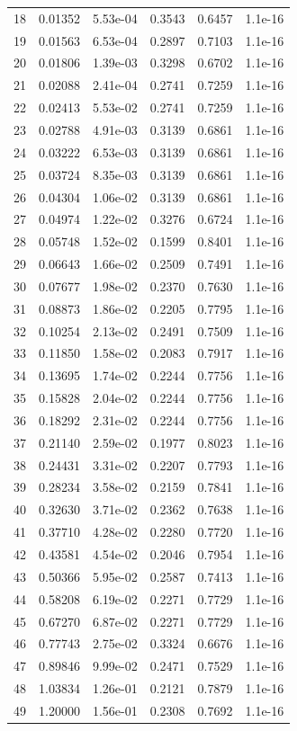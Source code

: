 {\begin{longtable}{rrrrrr}
18 & 0.01352 & 5.53e-04 & 0.3543 & 0.6457 & 1.1e-16 \\
19 & 0.01563 & 6.53e-04 & 0.2897 & 0.7103 & 1.1e-16 \\
20 & 0.01806 & 1.39e-03 & 0.3298 & 0.6702 & 1.1e-16 \\
21 & 0.02088 & 2.41e-04 & 0.2741 & 0.7259 & 1.1e-16 \\
22 & 0.02413 & 5.53e-02 & 0.2741 & 0.7259 & 1.1e-16 \\
23 & 0.02788 & 4.91e-03 & 0.3139 & 0.6861 & 1.1e-16 \\
24 & 0.03222 & 6.53e-03 & 0.3139 & 0.6861 & 1.1e-16 \\
25 & 0.03724 & 8.35e-03 & 0.3139 & 0.6861 & 1.1e-16 \\
26 & 0.04304 & 1.06e-02 & 0.3139 & 0.6861 & 1.1e-16 \\
27 & 0.04974 & 1.22e-02 & 0.3276 & 0.6724 & 1.1e-16 \\
28 & 0.05748 & 1.52e-02 & 0.1599 & 0.8401 & 1.1e-16 \\
29 & 0.06643 & 1.66e-02 & 0.2509 & 0.7491 & 1.1e-16 \\
30 & 0.07677 & 1.98e-02 & 0.2370 & 0.7630 & 1.1e-16 \\
31 & 0.08873 & 1.86e-02 & 0.2205 & 0.7795 & 1.1e-16 \\
32 & 0.10254 & 2.13e-02 & 0.2491 & 0.7509 & 1.1e-16 \\
33 & 0.11850 & 1.58e-02 & 0.2083 & 0.7917 & 1.1e-16 \\
34 & 0.13695 & 1.74e-02 & 0.2244 & 0.7756 & 1.1e-16 \\
35 & 0.15828 & 2.04e-02 & 0.2244 & 0.7756 & 1.1e-16 \\
36 & 0.18292 & 2.31e-02 & 0.2244 & 0.7756 & 1.1e-16 \\
37 & 0.21140 & 2.59e-02 & 0.1977 & 0.8023 & 1.1e-16 \\
38 & 0.24431 & 3.31e-02 & 0.2207 & 0.7793 & 1.1e-16 \\
39 & 0.28234 & 3.58e-02 & 0.2159 & 0.7841 & 1.1e-16 \\
40 & 0.32630 & 3.71e-02 & 0.2362 & 0.7638 & 1.1e-16 \\
41 & 0.37710 & 4.28e-02 & 0.2280 & 0.7720 & 1.1e-16 \\
42 & 0.43581 & 4.54e-02 & 0.2046 & 0.7954 & 1.1e-16 \\
43 & 0.50366 & 5.95e-02 & 0.2587 & 0.7413 & 1.1e-16 \\
44 & 0.58208 & 6.19e-02 & 0.2271 & 0.7729 & 1.1e-16 \\
45 & 0.67270 & 6.87e-02 & 0.2271 & 0.7729 & 1.1e-16 \\
46 & 0.77743 & 2.75e-02 & 0.3324 & 0.6676 & 1.1e-16 \\
47 & 0.89846 & 9.99e-02 & 0.2471 & 0.7529 & 1.1e-16 \\
48 & 1.03834 & 1.26e-01 & 0.2121 & 0.7879 & 1.1e-16 \\
49 & 1.20000 & 1.56e-01 & 0.2308 & 0.7692 & 1.1e-16 \\
\bottomrule
\end{longtable}}

